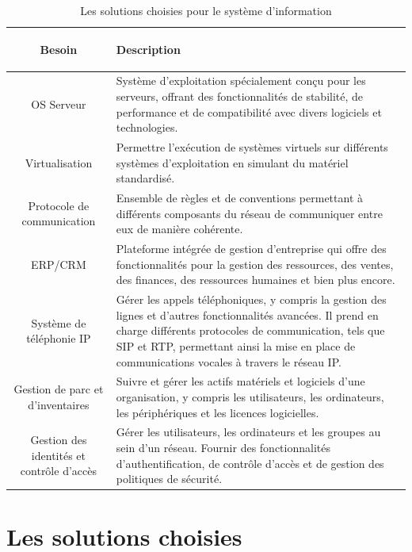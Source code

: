 \begin{table}[H]
\begin{center}
\begin{tabular}{|c{3cm}|l{10cm}|}
\hline
\textbf{Besoin} & \begin{center} \textbf{Description} \end{center} \\
\hline
OS Serveur & Système d'exploitation spécialement conçu pour les serveurs, offrant des fonctionnalités de stabilité, de performance et de compatibilité avec divers logiciels et technologies. \\
\hline
Virtualisation & Permettre l'exécution de systèmes virtuels sur différents systèmes d'exploitation en simulant du matériel standardisé. \\
\hline
Protocole de communication & Ensemble de règles et de conventions permettant à différents composants du réseau de communiquer entre eux de manière cohérente. \\
\hline
ERP/CRM & Plateforme intégrée de gestion d'entreprise qui offre des fonctionnalités pour la gestion des ressources, des ventes, des finances, des ressources humaines et bien plus encore. \\
\hline
Système de téléphonie IP & Gérer les appels téléphoniques, y compris la gestion des lignes et d'autres fonctionnalités avancées. Il prend en charge différents protocoles de communication, tels que SIP et RTP, permettant ainsi la mise en place de communications vocales à travers le réseau IP. \\
\hline
Gestion de parc et d'inventaires & Suivre et gérer les actifs matériels et logiciels d'une organisation, y compris les utilisateurs, les ordinateurs, les périphériques et les licences logicielles. \\
\hline
Gestion des identités et contrôle d'accès & Gérer les utilisateurs, les ordinateurs et les groupes au sein d'un réseau. Fournir des fonctionnalités d'authentification, de contrôle d'accès et de gestion des politiques de sécurité. \\
\hline
\end{tabular}
\caption{Les solutions choisies pour le système d'information}
\label{1}
\end{center}
\end{table}


\section{Les solutions choisies}

